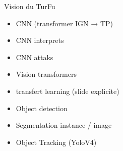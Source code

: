 \begin{frame}{Vision du TurFu}
    \begin{itemize}
      \item CNN (transformer IGN → TP)
      \item CNN interprets
      \item CNN attaks
      \item Vision transformers
      \item transfert learning (slide explicite)
      \item Object detection
      \item Segmentation instance / image
      \item Object Tracking (YoloV4)
    \end{itemize}
\end{frame}
